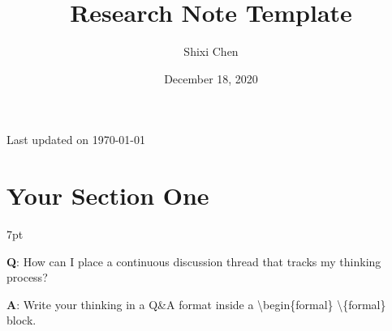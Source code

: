 \documentclass[11pt]{article}
\title{Research Note Template}
\author{Shixi Chen}
\date{December 18, 2020}
\newcommand{\updateinfo}[1][\today]{\par\vfill\hfill{\scriptsize\color{gray}Last updated on #1}}
\newenvironment{formal}{%
	\def\FrameCommand{%
		\hspace{1pt}%
		{\color{formalgray}\vrule width 2pt}%
		{\color{formalshade}\vrule width 4pt}%
		\colorbox{formalshade}%
	}%
	\MakeFramed{\advance\hsize-\width\FrameRestore}%
	\noindent\hspace{-4.55pt}%
	\begin{adjustwidth}{}{7pt}%
		\vspace{2pt}\vspace{2pt}%
	}
	{%
		\vspace{2pt}
	\end{adjustwidth}\endMakeFramed%
}
\begin{document}
\maketitle


{}
\tableofcontents
\updateinfo

\newpage
\section{Your Section One}

\blindtext

\begin{formal}
\textbf{Q}: How can I place a continuous discussion thread that tracks my thinking process?

\noindent\textbf{A}: Write your thinking in a Q\&A format inside a \textbackslash begin\{formal\} \textbackslash\{formal\} block. 
\end{formal}
\end{document}
